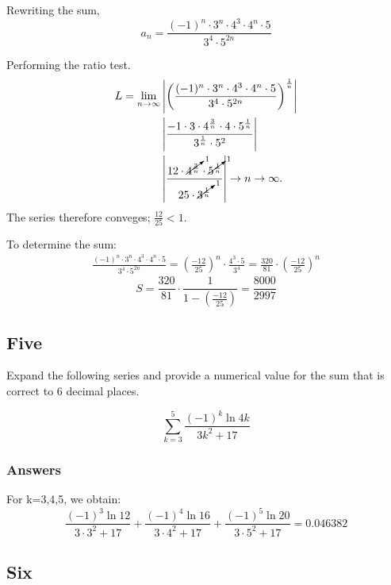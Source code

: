 \documentclass{article}
\begin{document}
Rewriting the sum,
\[
a_n = \frac{ (-1)^n \cdot 3^n \cdot 4^3 \cdot 4^n \cdot 5}{3^4 \cdot 5^{2n}}
\]

Performing the ratio test.
\begin{align*}
L = \lim_{n\to\infty} & \left| \left( \frac{(-1)^n \cdot 3^n \cdot 4^3 \cdot 4^n \cdot 5} {3^4 \cdot 5^{2n}}\right)^{\frac{1}{n}}\right| \\
& \left |\frac{-1 \cdot 3 \cdot 4^{\frac{3}{n}} \cdot 4 \cdot 5^{\frac{1}{n}}}{3^{\frac{1}{n}} \cdot 5^2} \right| \\
& \left | \frac {12 \cdot \cancelto{1}{4^{\frac{3}{n}}} \cdot \cancelto{1}{5^{\frac{1}{n}}}}{25 \cdot \cancelto{1}{3^{\frac{1}{n}}}} \right | \rightarrow n \to \infty.
\end{align*}
The series therefore conveges;  $\frac{12}{25} < 1$.

To determine the sum:
\begin{align*}
\frac{ (-1)^n \cdot 3^n \cdot 4^3 \cdot 4^n \cdot 5}{3^4 \cdot 5^{2n}}
= \left(\frac{-12}{25}\right)^n \cdot \frac{4^3 \cdot 5}{3^4} = \frac{320}{81} \cdot \left(\frac{-12}{25}\right)^n
\end{align*}
\[
S = \frac{320}{81} \cdot \frac{1}{1-\left(\frac{-12}{25}\right)} = \frac{8000}{2997}
\]

\par

\subsection*{Five}
Expand the following series and provide a numerical value for the sum that is correct to 6 decimal places.

\begin{equation}\label{a5}
\sum_{k=3}^{5} \frac{(-1)^k\ln{4k}}{3k^2+17}
\end{equation}

\subsubsection*{Answers}

For k=3,4,5, we obtain:
\[
\frac{(-1)^3\ln{12}}{3\cdot 3^2+17} + \frac{(-1)^4\ln{16}}{3\cdot 4^2+17} + \frac{(-1)^5\ln{20}}{3\cdot 5^2+17} = 0.046382
\]

\par

\subsection*{Six}
\end{document}
